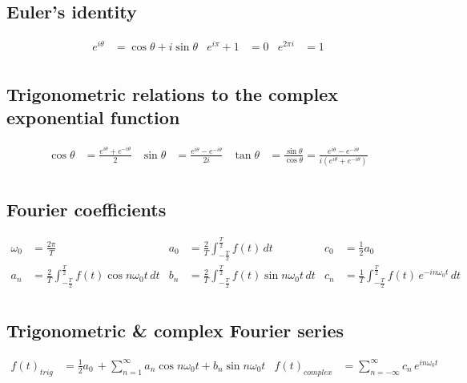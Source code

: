\subsection*{Euler's identity}
\begin{align*}
  e^{i\theta } &= \cos{\theta} +i\sin{\theta} & e^{i\pi}+1&= 0 & e^{2\pi i} &= 1\\
\end{align*}

\subsection*{Trigonometric relations to the complex exponential function}
\begin{align*}
  \cos{\theta} &= \frac{e^{i\theta}+e^{-i\theta}}{2}
  &\sin{\theta} &= \frac{e^{i\theta}-e^{-i\theta}}{2i}
  &\tan{\theta} &= \frac{\sin{\theta}}{\cos{\theta}} = \frac{e^{i\theta}-e^{-i\theta}}{i(e^{i\theta}+e^{-i\theta})}\\
\end{align*}

\subsection*{Fourier coefficients}
\begin{align*}
  \omega_0 &= \frac{2\pi}{T}
  &a_0 &= \frac{2}{T}\int_{-\frac{T}{2}}^{\frac{T}{2}} f(t) \,dt
  &c_0 &= \frac{1}{2}a_0\\
  a_n &= \frac{2}{T}\int_{-\frac{T}{2}}^{\frac{T}{2}}f(t)\cos{n\omega_0t} \,dt
  &b_n &= \frac{2}{T}\int_{-\frac{T}{2}}^{\frac{T}{2}}f(t)\sin{n\omega_0t} \,dt
  &c_n &= \frac{1}{T}\int_{-\frac{T}{2}}^{\frac{T}{2}}f(t)\,e^{-in\omega_0t} \,dt\\
\end{align*}

\subsection*{Trigonometric \& complex Fourier series}
\begin{align*}
  f(t)_{trig} &= \frac{1}{2}a_0 \,+ \sum_{n=1}^{\infty} a_n\cos{n\omega_0t} + b_n\sin{n\omega_0t}
  &f(t)_{complex} &= \sum_{n=-\infty}^{\infty} c_n \,e^{in\omega_0t}
\end{align*}

